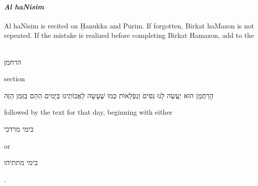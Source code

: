 \documentclass[11pt]{article}
\newcommand{\hebword}[1]{‎\begin{hebrew}\beginR #1 \endR\end{hebrew}}
\begin{document}
\paragraph{\textit{Al haNisim}}

Al haNisim is recited on \d{H}anukka and Purim.  If forgotten, Birkat haMazon is not repeated.  If the mistake is realized before completing Birkat Hamazon, add to the \hebword{הרחמן} section \hebword{הָרַחֲמָן הוּא יַעֲשֶׂה לָנוּ נִסִּים וְנִפְלָאוֹת כְּמוֹ שֶׁעָשָׂה לַאֲבוֹתֵינוּ בַּיָּמִים הַהֵם בַּזְּמַן הַזֶּה} followed by the text for that day, beginning with either \hebword{בימי מרדכי} or \hebword{בימי מתתיהו} \parencite*[44:16]{Kitzur}.

%
%
%
%
%
\end{document}
